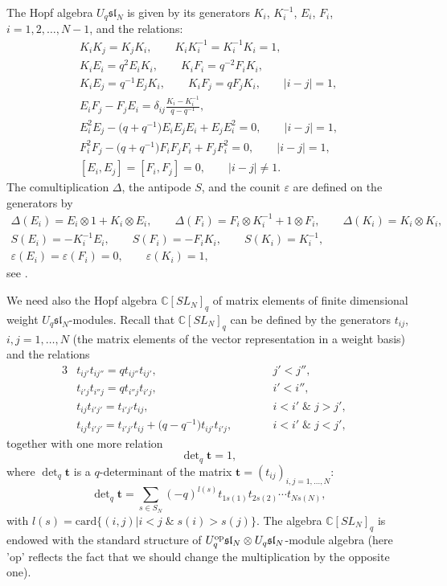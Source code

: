 \documentclass[11pt]{article}
\begin{document}
The Hopf algebra $U_q\mathfrak{sl}_{N}$ is given by its generators $K_i$, $K_i^{-1}$, $E_i$, $F_i$,
$i=1,2,\ldots,N-1$, and the relations:
\begin{gather*}
K_iK_j=K_jK_i,\qquad K_iK_i^{-1}=K_i^{-1}K_i=1,
\\
K_iE_i=q^2E_iK_i,\qquad K_iF_i=q^{-2}F_iK_i,
\\
K_iE_j=q^{-1}E_jK_i,\qquad K_iF_j=q F_jK_i, \qquad |i-j|=1,
\\
E_iF_j-F_jE_i=\delta_{ij}\frac{K_i-K_i^{-1}}{q-q^{-1}},
\\
E_i^2E_j-\big(q+q^{-1}\big)E_iE_jE_i+E_jE_i^2=0,\qquad|i-j|=1,
\\
F_i^2F_j-\big(q+q^{-1}\big)F_iF_jF_i+F_jF_i^2=0,\qquad|i-j|=1,
\\
[E_i,E_j]=[F_i,F_j]=0,\qquad|i-j|\ne 1.
\end{gather*}
 The comultiplication $\Delta$, the antipode $S$, and the counit
$\varepsilon$ are def\/ined on the generators by
\begin{gather*}
\Delta(E_i)=E_i\otimes 1+K_i\otimes E_i,\qquad \Delta(F_i)=F_i\otimes K_i^{-1}+1\otimes F_i,\qquad
\Delta(K_i)=K_i\otimes K_i,
\\
S(E_i)=-K_i^{-1}E_i,\qquad S(F_i)=-F_iK_i,\qquad S(K_i)=K_i^{-1},
\\
\varepsilon(E_i)=\varepsilon(F_i)=0,\qquad\varepsilon(K_i)=1,
\end{gather*} see \cite[Chapter 4]{Jant}.

We need also the Hopf algebra $\mathbb{C}[SL_{N}]_q$ of matrix elements of f\/inite dimensional weight
$U_q\mathfrak{sl}_{N}$-modules. Recall that $\mathbb{C}[SL_{N}]_q$ can be def\/ined by the generators $t_{ij}$,
$i,j=1,\dots,N$ (the matrix elements of the vector representation in a weight basis) and the relations
\begin{alignat*}{3}
&t_{ij'}t_{ij''}=qt_{ij''}t_{ij'},\qquad && j'<j'',&
\\ &t_{i'j}t_{i''j}=qt_{i''j}t_{i'j},\qquad && i'<i'',&
\\ &t_{ij}t_{i'j'}=t_{i'j'}t_{ij},\qquad && i<i'\;\&\;j>j', &
\\ &t_{ij}t_{i'j'}=t_{i'j'}t_{ij}+\big(q-q^{-1}\big)t_{ij'}t_{i'j},\qquad
&& i<i'\;\&\; j<j',&
\end{alignat*}
together with one more relation
\[
\det\nolimits_q\mathbf{t}=1,
\]
where $\det\nolimits_q\mathbf{t}$ is a $q$-determinant of the matrix $\mathbf{t}=(t_{ij})_{i,j=1,\dots,N}$:
\[
\det\nolimits_q\mathbf{t}=\sum\limits_{s\in S_{N}}(-q)^{l(s)}t_{1 s(1)} t_{2s(2)}\cdots t_{Ns(N)},
\]
with $l(s)=\mathrm{card}\{(i,j)|i<j\;\&\;s(i)>s(j)\}$. The algebra $\mathbb C[SL_N]_q$ is endowed with the
standard structure of $U_q^{\rm op}\mathfrak{sl}_N \otimes U_q \mathfrak{sl}_N$-module algebra (here 'op'
ref\/lects the fact that we should change the multiplication by the opposite one).
\end{document}
